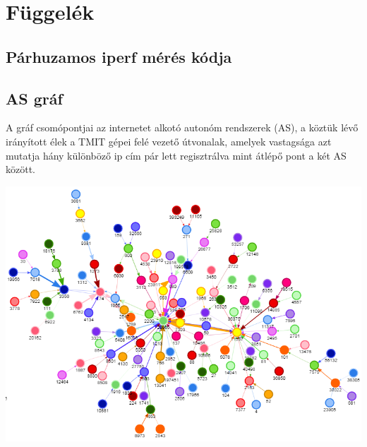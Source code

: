 
\chapter*{Függelék}
\section*{Párhuzamos iperf mérés kódja}


\section*{AS gráf}
A gráf csomópontjai az internetet alkotó autonóm rendszerek (AS), a köztük lévő irányított élek a TMIT gépei felé vezető útvonalak, amelyek vastagsága azt mutatja hány különböző ip cím pár lett regisztrálva mint átlépő pont a két AS között.

\bigskip
\bigskip


\includegraphics[width=1\textwidth,keepaspectratio]{figures/as-graph.png}